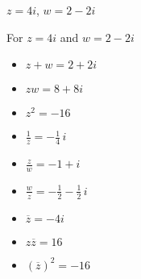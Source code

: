 {$z = 4i$, $w = 2-2i$}
{ For  $z = 4i$ and $w = 2-2i$

\begin{itemize}

\item $z+w = 2+2i$

\item $zw = 8+8i$

\item $z^2 = -16$

\item $\frac{1}{z} = -\frac{1}{4} \,i$

\item $\frac{z}{w} = -1+i$

\item $\frac{w}{z} = -\frac{1}{2} - \frac{1}{2} \,i$

\item $\overline{z} = -4i$

\item $z\overline{z} = 16$

\item $(\overline{z})^2 = -16$

\end{itemize}

}
